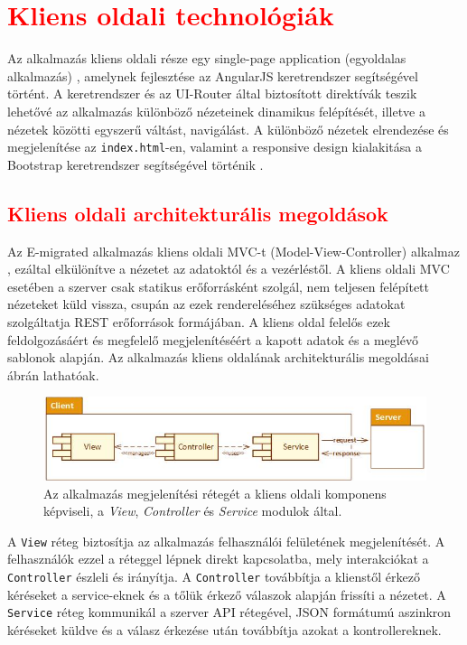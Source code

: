 \chapter{\textcolor{red}{Kliens oldali technológiák}}\label{ch:kliens}

\begin{osszefoglal}Az alkalmazás kliens oldali része egy single-page application (egyoldalas alkalmazás) \cite{SPA}, amelynek fejlesztése az AngularJS keretrendszer segítségével történt. A keretrendszer és az UI-Router által biztosított direktívák teszik lehetővé az alkalmazás különböző nézeteinek dinamikus felépítését, illetve a nézetek közötti egyszerű váltást, navigálást. A különböző nézetek elrendezése és megjelenítése az \texttt{index.html}-en, valamint a responsive design kialakitása a Bootstrap keretrendszer segítségével történik \cite{Bootstrap}.
\end{osszefoglal}

\section{\textcolor{red}{Kliens oldali architekturális megoldások}}
Az E-migrated alkalmazás kliens oldali MVC-t (Model-View-Controller) alkalmaz \cite{WebMVC}, ezáltal elkülönítve a nézetet az adatoktól és a vezérléstől. A kliens oldali MVC esetében a szerver csak statikus erőforrásként szolgál, nem teljesen felépített nézeteket küld vissza, csupán az ezek rendereléséhez szükséges adatokat szolgáltatja REST erőforrások formájában. A kliens oldal felelős ezek feldolgozásáért és megfelelő megjelenítéséért a kapott adatok és a meglévő sablonok alapján.
Az alkalmazás kliens oldalának architekturális megoldásai  ábrán lathatóak. 

\begin{figure}
  \centering
  \includegraphics[width=0.9\linewidth]{images/ClientArchitecture}
  \caption{Az alkalmazás megjelenítési rétegét a kliens oldali komponens képviseli, a \textit{View}, \textit{Controller} és \textit{Service} modulok által. }
  \label{fig:ClientArchitecture}
\end{figure}

A \texttt{View} réteg biztosítja az alkalmazás felhasználói felületének megjelenítését. A felhasználók ezzel a réteggel lépnek direkt kapcsolatba, mely interakciókat a \texttt{Controller} észleli és irányítja. A \texttt{Controller} továbbítja a klienstől érkező kéréseket a service-eknek és a tőlük érkező válaszok alapján frissíti a nézetet. A \texttt{Service} réteg kommunikál a szerver API rétegével, JSON formátumú aszinkron kéréseket küldve és a válasz érkezése után továbbítja azokat a kontrollereknek. 

